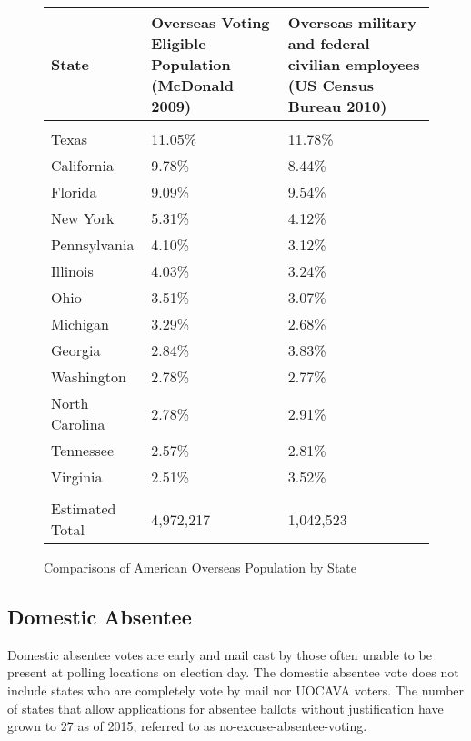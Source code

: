 \begin{figure}
\begin{center}
\begin{tabular}{l p{} p{}} %
  {\bf State} &
  {\bf Overseas Voting Eligible \newline Population} \newline(McDonald 2009) &
  {\bf Overseas military and federal \newline civilian employees}
  \newline(US Census Bureau 2010)\\\hline\\
Texas & 11.05\% & 11.78\%\\
California & 9.78\% & 8.44\% \\
Florida & 9.09\% & 9.54\% \\
New York & 5.31\% & 4.12\% \\
Pennsylvania & 4.10\% & 3.12\% \\
Illinois & 4.03\% & 3.24\% \\
Ohio & 3.51\% & 3.07\% \\
Michigan & 3.29\% & 2.68\% \\
Georgia & 2.84\% & 3.83\% \\
Washington & 2.78\% & 2.77\% \\
North Carolina & 2.78\% & 2.91\% \\
Tennessee & 2.57\% & 2.81\% \\
Virginia & 2.51\% & 3.52\% \\\hline\\
Estimated Total & 4,972,217 & 1,042,523
\end{tabular}
\end{center}
\caption{Comparisons of American Overseas Population by State}
\label{fig:uocava_populations} %
\end{figure}

\subsection{Domestic Absentee}
Domestic absentee votes are early and mail cast by those often unable to be
present at polling locations on election day. The domestic absentee vote does
not include states who are completely vote by mail nor UOCAVA voters.
The number of states that allow applications for absentee ballots without
justification have grown to 27 as of 2015, referred to as
no-excuse-absentee-voting.

